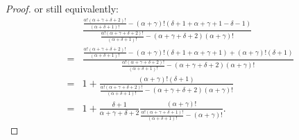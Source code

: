 \documentclass[version=3.21, pagesize, twoside=off, bibliography=totoc, DIV=calc, fontsize=12pt, a4paper]{scrartcl}
\begin{document}
\begin{proof}
	or still equivalently:
	\begin{align}
	& \frac{
			\frac{\alpha! (\alpha + \gamma + \delta + 2)!}{(\alpha + \delta + 1)!} - (\alpha + \gamma)! (\delta + 1 + \alpha + \gamma + 1 - \delta - 1)
		}{
			\frac{\alpha! (\alpha + \gamma + \delta + 2)!}{(\alpha + \delta + 1)!} - (\alpha + \gamma + \delta + 2) (\alpha + \gamma)!
		}\\
	= & \frac{
			\frac{\alpha! (\alpha + \gamma + \delta + 2)!}{(\alpha + \delta + 1)!} - (\alpha + \gamma)! (\delta + 1 + \alpha + \gamma + 1) + (\alpha + \gamma)! (\delta + 1) 
		}{
			\frac{\alpha! (\alpha + \gamma + \delta + 2)!}{(\alpha + \delta + 1)!} - (\alpha + \gamma + \delta + 2) (\alpha + \gamma)!
		}\\
	= & 1 + \frac{
			(\alpha + \gamma)! (\delta + 1) 
		}{
			\frac{\alpha! (\alpha + \gamma + \delta + 2)!}{(\alpha + \delta + 1)!} - (\alpha + \gamma + \delta + 2) (\alpha + \gamma)!
		}\\
	= & 1 + \frac{\delta + 1}{\alpha + \gamma + \delta + 2}
		\frac{
			(\alpha + \gamma)! 
		}{
			\frac{\alpha! (\alpha + \gamma + \delta + 1)!}{(\alpha + \delta + 1)!} - (\alpha + \gamma)!
		}.
	\end{align}
\end{proof}
\end{document}
